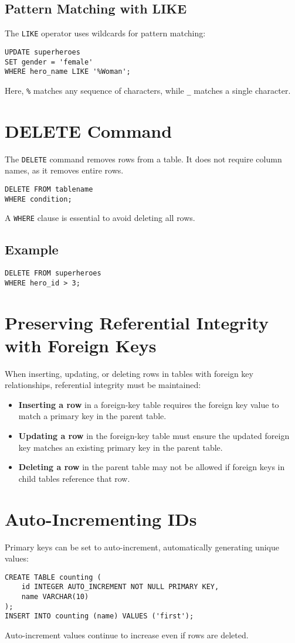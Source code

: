 \documentclass{article}
\begin{document}
\subsection{Pattern Matching with LIKE}
The \texttt{LIKE} operator uses wildcards for pattern matching:
\begin{verbatim}
UPDATE superheroes
SET gender = 'female'
WHERE hero_name LIKE '%Woman';
\end{verbatim}
Here, \texttt{\%} matches any sequence of characters, while \texttt{\_} matches a single character.

\section{DELETE Command}
The \texttt{DELETE} command removes rows from a table. It does not require column names, as it removes entire rows.
\begin{verbatim}
DELETE FROM tablename
WHERE condition;
\end{verbatim}
A \texttt{WHERE} clause is essential to avoid deleting all rows.

\subsection{Example}
\begin{verbatim}
DELETE FROM superheroes
WHERE hero_id > 3;
\end{verbatim}

\section{Preserving Referential Integrity with Foreign Keys}
When inserting, updating, or deleting rows in tables with foreign key relationships, referential integrity must be maintained:
\begin{itemize}
    \item \textbf{Inserting a row} in a foreign-key table requires the foreign key value to match a primary key in the parent table.
    \item \textbf{Updating a row} in the foreign-key table must ensure the updated foreign key matches an existing primary key in the parent table.
    \item \textbf{Deleting a row} in the parent table may not be allowed if foreign keys in child tables reference that row.
\end{itemize}

\section{Auto-Incrementing IDs}
Primary keys can be set to auto-increment, automatically generating unique values:
\begin{verbatim}
CREATE TABLE counting (
    id INTEGER AUTO_INCREMENT NOT NULL PRIMARY KEY,
    name VARCHAR(10)
);
INSERT INTO counting (name) VALUES ('first');
\end{verbatim}
Auto-increment values continue to increase even if rows are deleted.
\end{document}
